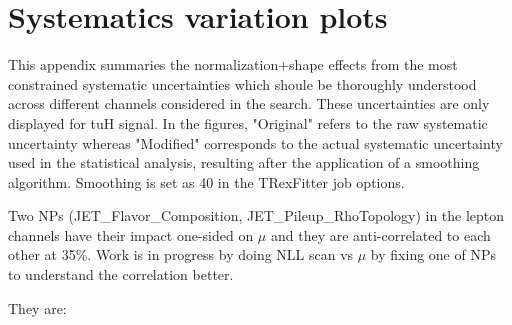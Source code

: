\section{Systematics variation plots}
\label{sec:sys_variation}


This appendix summaries the normalization+shape effects from the most constrained systematic uncertainties which shoule be thoroughly understood across different channels considered in the search. These uncertainties are only displayed for tuH signal. In the figures, "Original" refers to the raw systematic uncertainty whereas "Modified" corresponds to the actual systematic uncertainty used in the statistical analysis, resulting after the application of a smoothing algorithm. Smoothing is set as 40 in the TRexFitter job options.

Two NPs (JET\_Flavor\_Composition, JET\_Pileup\_RhoTopology) in the lepton channels have their impact one-sided on $\mu$ and they are anti-correlated to each other
at 35\%. Work is in progress by doing NLL scan vs $\mu$ by fixing one of NPs to understand the correlation better.

They are:

